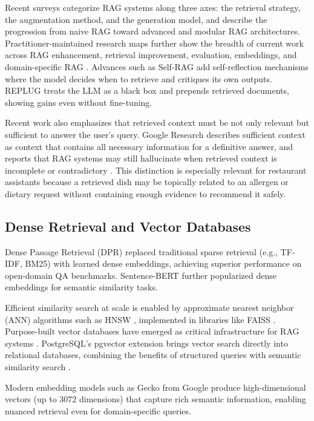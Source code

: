 Recent surveys \cite{Gao2024RAGSurvey, Fan2024RAGSurvey2} categorize RAG systems along three axes: the retrieval strategy, the augmentation method, and the generation model, and describe the progression from naive RAG toward advanced and modular RAG architectures. Practitioner-maintained research maps further show the breadth of current work across RAG enhancement, retrieval improvement, evaluation, embeddings, and domain-specific RAG \cite{Aishwarya2026RAGTable}. Advances such as Self-RAG \cite{Asai2024SelfRAG} add self-reflection mechanisms where the model decides when to retrieve and critiques its own outputs. REPLUG \cite{Shi2024RAGEval} treats the LLM as a black box and prepends retrieved documents, showing gains even without fine-tuning.

Recent work also emphasizes that retrieved context must be not only relevant but sufficient to answer the user's query. Google Research describes sufficient context as context that contains all necessary information for a definitive answer, and reports that RAG systems may still hallucinate when retrieved context is incomplete or contradictory \cite{Rashtchian2025SufficientContextBlog}. This distinction is especially relevant for restaurant assistants because a retrieved dish may be topically related to an allergen or dietary request without containing enough evidence to recommend it safely.

\subsection{Dense Retrieval and Vector Databases}
Dense Passage Retrieval (DPR) \cite{Karpukhin2020DPR} replaced traditional sparse retrieval (e.g., TF-IDF, BM25) with learned dense embeddings, achieving superior performance on open-domain QA benchmarks. Sentence-BERT \cite{Reimers2019SentenceBERT} further popularized dense embeddings for semantic similarity tasks.

Efficient similarity search at scale is enabled by approximate nearest neighbor (ANN) algorithms such as HNSW \cite{Malkov2020HNSW}, implemented in libraries like FAISS \cite{Johnson2021FAISS}. Purpose-built vector databases have emerged as critical infrastructure for RAG systems \cite{Pan2024VectorDB}. PostgreSQL's pgvector extension brings vector search directly into relational databases, combining the benefits of structured queries with semantic similarity search \cite{Guo2022pgvector}.

Modern embedding models such as Gecko \cite{Lee2024GeminiEmbed} from Google produce high-dimensional vectors (up to 3072 dimensions) that capture rich semantic information, enabling nuanced retrieval even for domain-specific queries.

